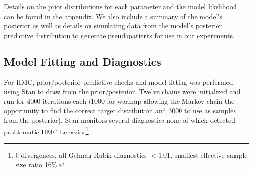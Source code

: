 %
%
%
%

Details on the prior distributions for each parameter and the model likelihood can be found in the appendix.  We also include a summary of the model's posterior as well as details on simulating data from the model's posterior predictive distribution to generate pseudopatients for use in our experiments.

\subsection*{Model Fitting and Diagnostics}

For HMC, prior/posterior predictive checks and model fitting was performed using Stan \cite{Carpenter2017-qf} to draw from the prior/posterior.  Twelve chains were initialized and run for 4000 iterations each (1000 for warmup allowing the Markov chain the opportunity to find the correct target distribution and 3000 to use as samples from the posterior). Stan monitors several diagnostics none of which detected problematic HMC behavior\footnote{0 divergences, all Gelman-Rubin diagnostics $<1.01$, smallest effective sample size ratio 16\%.}.

